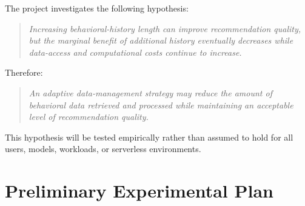\documentclass[12pt,a4paper]{article}
\begin{document}
The project investigates the following hypothesis:
\begin{quote}
\textit{Increasing behavioral-history length can improve recommendation quality, but the marginal benefit of additional history eventually decreases while data-access and computational costs continue to increase.}
\end{quote}

Therefore:
\begin{quote}
\textit{An adaptive data-management strategy may reduce the amount of behavioral data retrieved and processed while maintaining an acceptable level of recommendation quality.}
\end{quote}

This hypothesis will be tested empirically rather than assumed to hold for all users, models, workloads, or serverless environments.

\section{Preliminary Experimental Plan}
\end{document}
